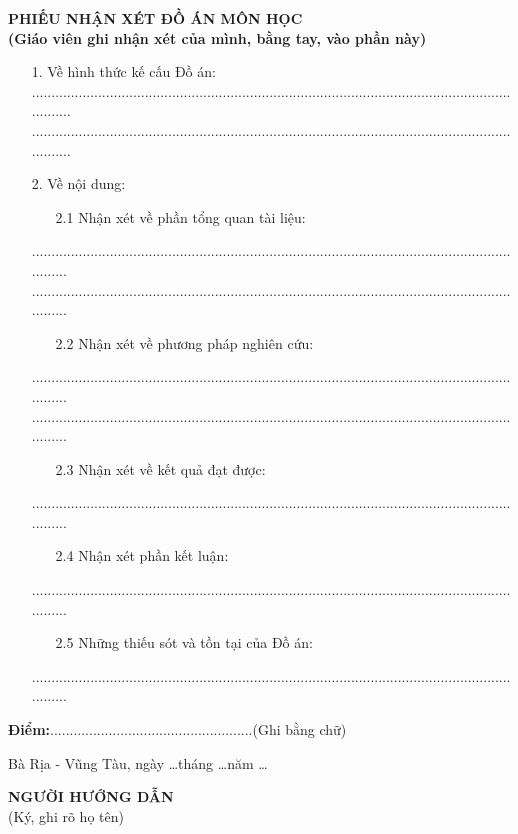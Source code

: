\documentclass[12pt,a4paper]{report}
\begin{document}
\begin{center}
	\centering
	\textbf{PHIẾU NHẬN XÉT ĐỒ ÁN MÔN HỌC}\\
	\textbf{(Giáo viên ghi nhận xét của mình, bằng tay, vào phần này)}
\end{center}
\begin{enumerate}
	\item[1.] Về hình thức kế cấu Đồ án:\\.....................................................................................................................................\\.....................................................................................................................................
	\item[2.] Về nội dung: 
	\begin{enumerate}
		\item[2.1] Nhận xét về phần tổng quan tài liệu:
	\end{enumerate}
	\item[] ....................................................................................................................................\\....................................................................................................................................
	\begin{enumerate}
		\item[2.2] Nhận xét về phương pháp nghiên cứu:
	\end{enumerate}
	\item[] ....................................................................................................................................\\....................................................................................................................................
	\begin{enumerate}
		\item[2.3] Nhận xét về kết quả đạt được:
	\end{enumerate}
	\item[] ....................................................................................................................................
	\begin{enumerate}
		\item[2.4] Nhận xét phần kết luận:
	\end{enumerate}
	\item[] ....................................................................................................................................
	\begin{enumerate}
		\item[2.5] Những thiếu sót và tồn tại của Đồ án:
	\end{enumerate}
	\item[] ....................................................................................................................................
\end{enumerate}
\textbf{Điểm:}....................................................(Ghi bằng chữ)
\begin{flushright}
Bà Rịa - Vũng Tàu, ngày \ldots tháng \ldots năm \ldots \\
\end{flushright}
\hspace{300pt} \textbf{NGƯỜI HƯỚNG DẪN}\\
\hspace*{316pt} (Ký, ghi rõ họ tên)
\end{document}
